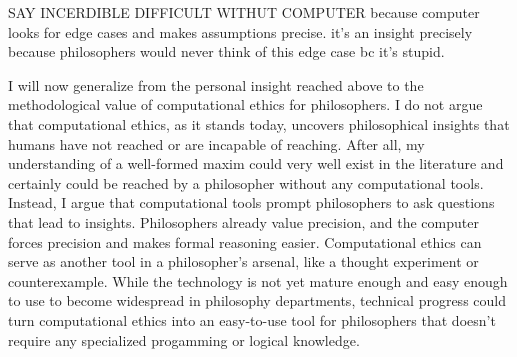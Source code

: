 \begin{isabellebody}
\begin{isamarkuptext}
SAY INCERDIBLE DIFFICULT WITHUT COMPUTER because computer looks for edge cases and makes assumptions precise.
it's an insight precisely because philosophers would never think of this edge case bc it's stupid.%
\end{isamarkuptext}\isamarkuptrue%
%
\isadelimdocument
%
\endisadelimdocument
%
\isatagdocument
%
\isamarkuptrue%
%
\endisatagdocument
{\isafolddocument}%
%
\isadelimdocument
%
\endisadelimdocument
%
\begin{isamarkuptext}%
I will now generalize from the personal insight reached above to the methodological value of 
computational ethics for philosophers.
I do not argue that computational ethics, as it stands today, uncovers philosophical insights that humans have not reached
or are incapable of reaching. After all, my understanding of a well-formed maxim could 
very well exist in the literature and certainly could be reached by a philosopher without any 
computational tools. Instead, I argue that computational tools prompt philosophers to ask questions that 
lead to insights. Philosophers already value precision, and the computer forces precision and makes formal
reasoning easier. Computational 
ethics can serve as another tool in a philosopher's arsenal, like a thought experiment or counterexample.
While the technology is not yet mature enough and easy enough to use to become widespread in philosophy
departments, technical progress could turn computational ethics into an easy-to-use tool for philosophers
that doesn't require any specialized progamming or logical knowledge.


\end{isamarkuptext}
\end{isabellebody}
